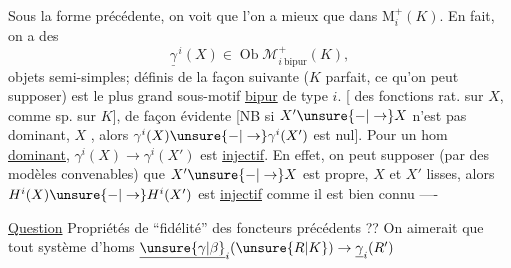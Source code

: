 Sous la forme précédente, on voit que
l'on a mieux que  
dans $\mathrm{M}^{+}_i(K)$. En fait, on a des
\[
\underline{\gamma}^{\,i}(X)\in
\operatorname{Ob}\mathcal{M}^{+}_{i\ \mathrm{bipur}}(K),
\]
objets semi-simples;
définis de la façon suivante ($K$ parfait,
ce qu'on peut supposer)
est le plus grand sous-motif \uline{bipur} de
type $i$.
\deleted{[Ainsi le foncteur $\unsure{\gamma^i(X)}$}
[  des fonctions rat. sur $X$,
comme sp. sur $K$], de façon évidente
[NB si $X'\unsure{-|\to}X$ n'est pas dominant,
$X$ , alors
$\gamma^i(X)\unsure{-|\to}\gamma^i(X')$ est
nul]. Pour un hom \uline{dominant},
$\gamma^i(X)\to\gamma^i(X')$ est \uline{injectif}. En effet,
on peut supposer (par des modèles convenables)
que $X'\unsure{-|\to}X$ est propre, 
$X$ et $X'$ lisses,
alors $H^i(X)\unsure{-|\to}H^i(X')$ est \uline{injectif} comme
il est bien connu ----

\uline{Question} 
Propriétés de
``fidélité''  des foncteurs précédents ??
On aimerait
que tout  système d'homs
$\underline{\unsure{\gamma|\beta}}_i(\unsure{R|K})\to
\underline{\gamma}_i(R')$
